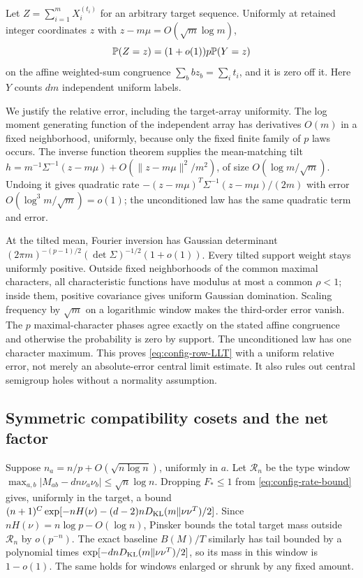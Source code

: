Let $Z=\sum_{i=1}^mX_i^{(t_i)}$ for an arbitrary target sequence.
Uniformly at retained integer coordinates $z$ with
$z-m\mu=O(\sqrt m\log m)$,
\begin{equation}\label{eq:config-row-LLT}
 \mathbb P(Z=z)=(1+o(1))p\mathbb P(Y=z)
\end{equation}
on the affine weighted-sum congruence
$\sum_bbz_b=\sum_it_i$, and it is zero off it. Here $Y$ counts
$dm$ independent uniform labels.

We justify the relative error, including the target-array uniformity.
The log moment generating function of the independent array has
derivatives $O(m)$ in a fixed neighborhood, uniformly, because only
the fixed finite family of $p$ laws occurs. The inverse function
theorem supplies the mean-matching tilt
$h=m^{-1}\Sigma^{-1}(z-m\mu)+O(\|z-m\mu\|^2/m^2)$,
of size $O(\log m/\sqrt m)$. Undoing it gives quadratic rate
$-(z-m\mu)^T\Sigma^{-1}(z-m\mu)/(2m)$ with error
$O(\log^3m/\sqrt m)=o(1)$; the unconditioned law has the same
quadratic term and error.

At the tilted mean, Fourier inversion has Gaussian determinant
$(2\pi m)^{-(p-1)/2}(\det\Sigma)^{-1/2}(1+o(1))$.
Every tilted support weight stays uniformly positive. Outside fixed
neighborhoods of the common maximal characters, all characteristic
functions have modulus at most a common $\rho<1$; inside them,
positive covariance gives uniform Gaussian domination. Scaling
frequency by $\sqrt m$ on a logarithmic window makes the third-order
error vanish. The $p$ maximal-character phases agree exactly on
the stated affine congruence and otherwise the probability is zero
by support. The unconditioned law has one character maximum.
This proves \eqref{eq:config-row-LLT} with a uniform relative error,
not merely an absolute-error central limit estimate. It also rules
out central semigroup holes without a normality assumption.

\subsection{Symmetric compatibility cosets and the net factor}
Suppose $n_a=n/p+O(\sqrt{n\log n})$, uniformly in $a$.
Let $\mathcal R_n$ be the type window
$\max_{a,b}|M_{ab}-dn\nu_a\nu_b|\le\sqrt n\log n$.
Dropping $F_*\le1$ from \eqref{eq:config-rate-bound} gives, uniformly
in the target, a bound
$(n+1)^C\exp[-nH(\nu)-(d-2)nD_{\mathrm{KL}}(m\Vert\nu\nu^T)/2]$.
Since $nH(\nu)=n\log p-O(\log n)$, Pinsker bounds the total target
mass outside $\mathcal R_n$ by $o(p^{-n})$.
The exact baseline $B(M)/T$ similarly has tail bounded by a polynomial
times $\exp[-dnD_{\mathrm{KL}}(m\Vert\nu\nu^T)/2]$, so its mass in this
window is $1-o(1)$. The same holds for windows enlarged or shrunk
by any fixed amount.

